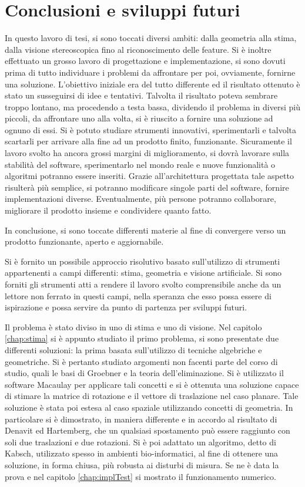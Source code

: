 \chapter{Conclusioni e sviluppi futuri}

In questo lavoro di tesi, si sono toccati diversi ambiti: dalla geometria alla stima, dalla visione stereoscopica fino al riconoscimento delle feature. Si è inoltre effettuato un grosso lavoro di progettazione e implementazione, si sono dovuti prima di tutto individuare i problemi da affrontare per poi, ovviamente, fornirne una soluzione. L'obiettivo iniziale era del tutto differente ed il risultato ottenuto è stato un susseguirsi di idee e tentativi. Talvolta il risultato poteva sembrare troppo lontano, ma procedendo a testa bassa, dividendo il problema in diversi più piccoli, da affrontare uno alla volta, si è riuscito a fornire una soluzione ad ognuno di essi. Si è potuto studiare strumenti innovativi, sperimentarli e talvolta scartarli per arrivare alla fine ad un prodotto finito, funzionante. Sicuramente il lavoro svolto ha ancora grossi margini di miglioramento, si dovrà lavorare sulla stabilità del software, sperimentarlo nel mondo reale e nuove funzionalità o algoritmi potranno essere inseriti. Grazie all'architettura progettata tale aspetto risulterà più semplice, si potranno modificare singole parti del software, fornire implementazioni diverse. Eventualmente, più persone potranno collaborare, migliorare il prodotto insieme e condividere quanto fatto. 

In conclusione, si sono toccate differenti materie al fine di convergere verso un prodotto funzionante, aperto e aggiornabile.

Si è fornito un possibile approccio risolutivo basato sull'utilizzo di strumenti appartenenti a campi differenti: stima, geometria e visione artificiale. Si sono forniti gli strumenti atti a rendere il lavoro svolto comprensibile anche da un lettore non ferrato in questi campi, nella speranza che esso possa essere di ispirazione e possa servire da punto di partenza per sviluppi futuri. 

Il problema è stato diviso in uno di stima e uno di visione. Nel capitolo \ref{chap:stima} si è appunto studiato il primo problema, si sono presentate due differenti soluzioni: la prima basata sull'utilizzo di tecniche algebriche e geometriche. Si è pertanto studiato argomenti non facenti parte del corso di studio, quali le basi di Groebner e la teoria dell'eliminazione. Si è utilizzato il software Macaulay per applicare tali concetti e si è ottenuta una soluzione capace di stimare la matrice di rotazione e il vettore di traslazione nel caso planare. Tale soluzione è stata poi estesa al caso spaziale utilizzando concetti di geometria. In particolare si è dimostrato, in maniera differente e in accordo al risultato di Denavit ed Hartemberg, che un qualsiasi spostamento può essere raggiunto con soli due traslazioni e due rotazioni. Si è poi adattato un algoritmo, detto di Kabsch, utilizzato spesso in ambienti bio-informatici, al fine di ottenere una soluzione, in forma chiusa, più robusta ai disturbi di misura. Se ne è data la prova e nel capitolo \ref{chap:implTest} si mostrato il funzionamento numerico.

